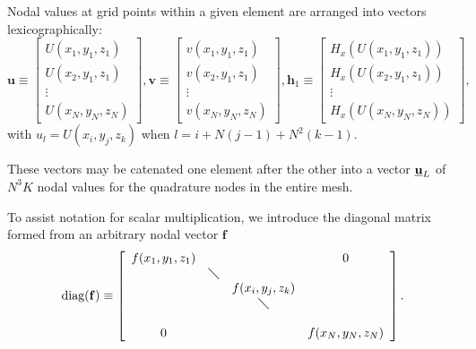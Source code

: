 Nodal values at grid points within a given element are arranged into
vectors lexicographically:
\begin{equation}
\mathbf{u}\equiv\left[\begin{array}{c} U(x_1,y_1,z_1) \\  U(x_2,y_1,z_1) \\ \vdots \\ U(x_N,y_N,z_N) \end{array}\right],
\mathbf{v}\equiv\left[\begin{array}{c} v(x_1,y_1,z_1) \\ v(x_2,y_1,z_1) \\  \vdots \\ v(x_N,y_N,z_N) \end{array}\right],
\mathbf{h}_1\equiv\left[\begin{array}{c} H_x(U(x_1,y_1,z_1))\\ H_x(U(x_2,y_1,z_1))\\   \vdots \\ H_x(U(x_N,y_N,z_N)) \end{array}\right],
\label{gridvects}
\end{equation}
with $u_l=U(x_i,y_j,z_k)$ when $l=i+N(j\!-\!1)+N^2(k\!-\!1)$.

These vectors may be catenated one element after the other into a vector ${\underline {\bf u}}_L$ of $N^3 K$ nodal
values for
the quadrature nodes in the entire mesh.

To assist notation for scalar multiplication, we introduce the diagonal matrix formed
from an arbitrary nodal vector $\mathbf{f}$
\begin{equation}
\mbox{diag}(\mathbf{f})\equiv \left[\begin{array}{cccc} f(x_1,y_1,z_1) & & & 0 \\
                                                        & \diagdown & & \\ 
                                                        & & f(x_i,y_j,z_k)  & \\
                                                        & & \diagdown & \\
                                                        & & & \\
                                                        0 & & & f(x_N,y_N,z_N)\end{array}\right].
\label{diagalot}
\end{equation}

